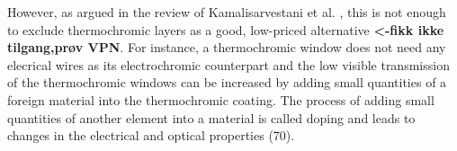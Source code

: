 However, as argued in the review of Kamalisarvestani et al.
\cite{Kamalisarvestani2013}, this is not enough to exclude thermochromic layers 
as a good, low-priced alternative \cite{Mlyuka2009} \textbf{<-fikk ikke tilgang,prøv VPN}. 
For instance, a thermochromic window does not need any 
elecrical wires as its electrochromic counterpart and the low visible transmission of the
thermochromic windows can be increased by adding small quantities of a foreign material 
into the thermochromic coating. The process of adding small quantities of another element 
into a material is called doping and leads to changes in the electrical and optical properties 
\cite[p.~39]{Kanu2010}(70). 









